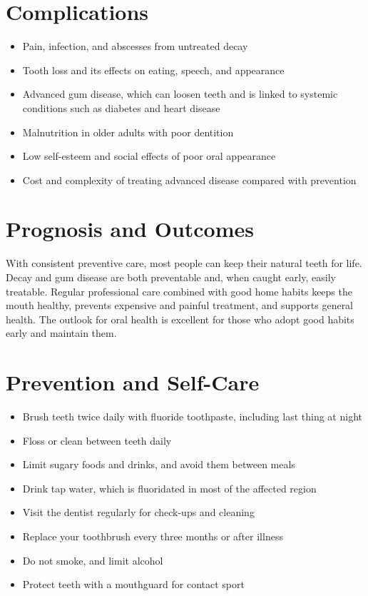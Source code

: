 \section*{Complications}
\begin{itemize}
    \item Pain, infection, and abscesses from untreated decay
    \item Tooth loss and its effects on eating, speech, and appearance
    \item Advanced gum disease, which can loosen teeth and is linked to systemic conditions such as diabetes and heart disease
    \item Malnutrition in older adults with poor dentition
    \item Low self-esteem and social effects of poor oral appearance
    \item Cost and complexity of treating advanced disease compared with prevention
\end{itemize}

\section*{Prognosis and Outcomes}
With consistent preventive care, most people can keep their natural teeth for life. Decay and gum disease are both preventable and, when caught early, easily treatable. Regular professional care combined with good home habits keeps the mouth healthy, prevents expensive and painful treatment, and supports general health. The outlook for oral health is excellent for those who adopt good habits early and maintain them.

\section*{Prevention and Self-Care}
\begin{itemize}
    \item Brush teeth twice daily with fluoride toothpaste, including last thing at night
    \item Floss or clean between teeth daily
    \item Limit sugary foods and drinks, and avoid them between meals
    \item Drink tap water, which is fluoridated in most of the affected region
    \item Visit the dentist regularly for check-ups and cleaning
    \item Replace your toothbrush every three months or after illness
    \item Do not smoke, and limit alcohol
    \item Protect teeth with a mouthguard for contact sport
\end{itemize}

